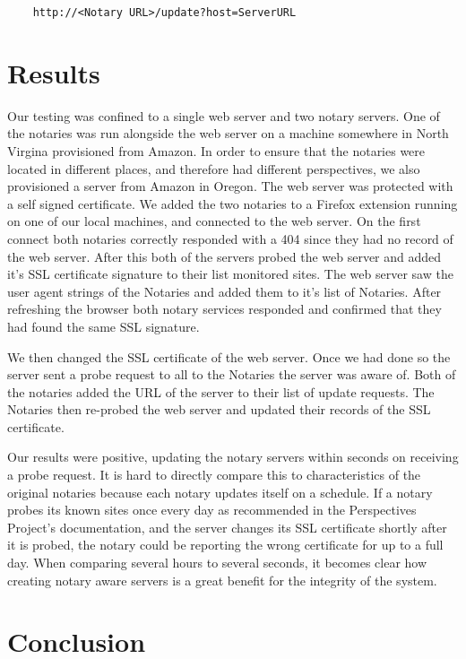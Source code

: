 \documentclass[preprint,review,12pt]{elsarticle}
\begin{document}
\begin{verbatim}
    http://<Notary URL>/update?host=ServerURL
\end{verbatim}



\section{Results}
\label{results}

Our testing was confined to a single web server and two notary servers. One of
the notaries was run alongside the web server on a machine somewhere in North
Virgina provisioned from Amazon. In order to ensure that the notaries were
located in different places, and therefore had different perspectives, we also
provisioned a server from Amazon in Oregon. The web server was protected with a
self signed certificate. We added the two notaries to a Firefox extension
running on one of our local machines, and connected to the web server. On the
first connect both notaries correctly responded with a 404 since they had no
record of the web server. After this both of the servers probed the web server
and added it's SSL certificate signature to their list monitored sites. The web
server saw the user agent strings of the Notaries and added them to it's list
of Notaries. After refreshing the browser both notary services responded and
confirmed that they had found the same SSL signature.

We then changed the SSL certificate of the web server. Once we had done so the
server sent a probe request to all to the Notaries the server was aware of.
Both of the notaries added the URL of the server to their list of update
requests. The Notaries then re-probed the web server and updated their records
of the SSL certificate.

Our results were positive, updating the notary servers within seconds on
receiving a probe request. It is hard to directly compare this to
characteristics of the original notaries because each notary updates itself on
a schedule. If a notary probes its known sites once every day as recommended in
the Perspectives Project's documentation, and the server changes its SSL
certificate shortly after it is probed, the notary could be reporting the wrong
certificate for up to a full day.  When comparing several hours to several
seconds, it becomes clear how creating notary aware servers is a great benefit
for the integrity of the system.



\section{Conclusion}
\label{conclusion}
\end{document}
